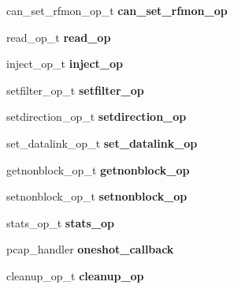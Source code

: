 \begin{DoxyCompactItemize}
\item 
\hypertarget{structpcap_afb45295fb4687b699f3d00f7baf37b5d}{
can\_\-set\_\-rfmon\_\-op\_\-t {\bfseries can\_\-set\_\-rfmon\_\-op}}
\label{structpcap_afb45295fb4687b699f3d00f7baf37b5d}

\item 
\hypertarget{structpcap_a84d91dc2e3d3adbe95c4027c2ba8f6b9}{
read\_\-op\_\-t {\bfseries read\_\-op}}
\label{structpcap_a84d91dc2e3d3adbe95c4027c2ba8f6b9}

\item 
\hypertarget{structpcap_ab563b04570ae7665a5bf81473716b987}{
inject\_\-op\_\-t {\bfseries inject\_\-op}}
\label{structpcap_ab563b04570ae7665a5bf81473716b987}

\item 
\hypertarget{structpcap_a22f8bfed5d7eabbd4727a2358d191bb1}{
setfilter\_\-op\_\-t {\bfseries setfilter\_\-op}}
\label{structpcap_a22f8bfed5d7eabbd4727a2358d191bb1}

\item 
\hypertarget{structpcap_a9f1e72057bd1f1c11224c80d3d22573d}{
setdirection\_\-op\_\-t {\bfseries setdirection\_\-op}}
\label{structpcap_a9f1e72057bd1f1c11224c80d3d22573d}

\item 
\hypertarget{structpcap_adb34235ccc82c03a4d86817cfe4553e6}{
set\_\-datalink\_\-op\_\-t {\bfseries set\_\-datalink\_\-op}}
\label{structpcap_adb34235ccc82c03a4d86817cfe4553e6}

\item 
\hypertarget{structpcap_a772abf2d1fc601b9b3b234e92fc54e68}{
getnonblock\_\-op\_\-t {\bfseries getnonblock\_\-op}}
\label{structpcap_a772abf2d1fc601b9b3b234e92fc54e68}

\item 
\hypertarget{structpcap_a060ce971303a49e2b1a4ce02f4f5845c}{
setnonblock\_\-op\_\-t {\bfseries setnonblock\_\-op}}
\label{structpcap_a060ce971303a49e2b1a4ce02f4f5845c}

\item 
\hypertarget{structpcap_a03895f1ca84708d5ba52c7e9917869d3}{
stats\_\-op\_\-t {\bfseries stats\_\-op}}
\label{structpcap_a03895f1ca84708d5ba52c7e9917869d3}

\item 
\hypertarget{structpcap_a5ffffde064c86d826169239ae45b8fd5}{
pcap\_\-handler {\bfseries oneshot\_\-callback}}
\label{structpcap_a5ffffde064c86d826169239ae45b8fd5}

\item 
\hypertarget{structpcap_a97db6d4be8dbcbea5fc99f7402f1ee38}{
cleanup\_\-op\_\-t {\bfseries cleanup\_\-op}}
\label{structpcap_a97db6d4be8dbcbea5fc99f7402f1ee38}


\end{DoxyCompactItemize}
